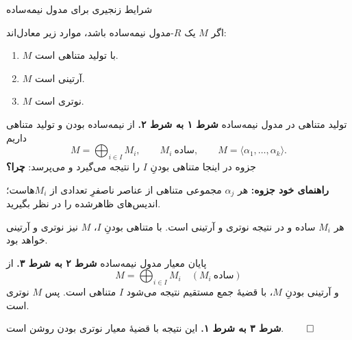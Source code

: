 \begin{frame}[t]{شرایط زنجیری برای مدول نیمه‌ساده}
    \label{lec11:semisimple-criterion}
    \begin{theorem}
        اگر $M$ یک $R$-مدول نیمه‌ساده باشد، موارد زیر معادل‌اند:
        \begin{enumerate}
            \item $M$ با تولید متناهی است.
            \item $M$ آرتینی است.
            \item $M$ نوتری است.
        \end{enumerate}
    \end{theorem}
\end{frame}

\begin{frame}[t]{تولید متناهی در مدول نیمه‌ساده}
    \label{lec11:semisimple-finite-support}
    \textbf{شرط ۱ به شرط ۲.}
    از نیمه‌ساده بودن و تولید متناهی داریم
    \[
        M=\bigoplus_{i\in I}M_i,
        \qquad M_i\ \text{ساده},
        \qquad M=\langle\alpha_1,\ldots,\alpha_k\rangle.
    \]
    جزوه در اینجا متناهی بودنِ $I$ را نتیجه می‌گیرد و می‌پرسد: \textbf{چرا؟}

    \medskip
    \textbf{راهنمای خود جزوه:}
    هر $\alpha_j$ مجموعی متناهی از عناصر ناصفرِ تعدادی از $M_i$هاست؛
    اندیس‌های ظاهرشده را در نظر بگیرید.

    \medskip
    هر $M_i$ ساده و در نتیجه نوتری و آرتینی است. با متناهی بودنِ $I$،
    $M$ نیز نوتری و آرتینی خواهد بود.
\end{frame}

\begin{frame}[t]{پایان معیار مدول نیمه‌ساده}
    \label{lec11:semisimple-end}
    \textbf{شرط ۲ به شرط ۳.}
    از
    \[
        M=\bigoplus_{i\in I}M_i\quad(M_i\ \text{ساده})
    \]
    و آرتینی بودنِ $M$، با قضیهٔ جمع مستقیم نتیجه می‌شود $I$ متناهی است.
    پس $M$ نوتری است.

    \medskip
    \textbf{شرط ۳ به شرط ۱.}
    این نتیجه با قضیهٔ معیار نوتری بودن روشن است.
    \hfill\(\qed\)
\end{frame}

